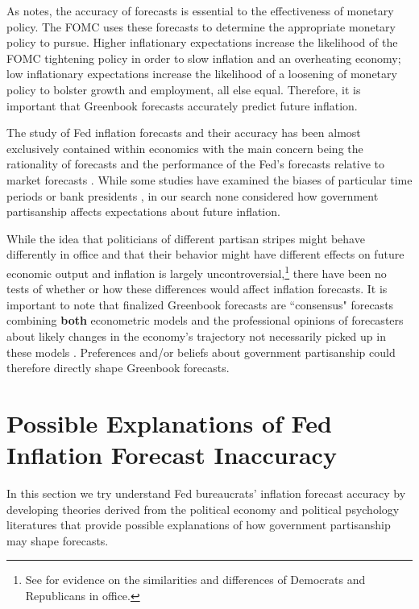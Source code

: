 \documentclass[a4paper]{article}\usepackage{graphicx, color}
\begin{document}
As \cite{Svensson2005} notes, the accuracy of forecasts is essential to the effectiveness of monetary policy. The FOMC uses these forecasts to determine the appropriate monetary policy to pursue. Higher inflationary expectations increase the likelihood of the FOMC tightening policy in order to slow inflation and an overheating economy; low inflationary expectations increase the likelihood of a loosening of monetary policy to bolster growth and employment, all else equal. Therefore, it is important that Greenbook forecasts accurately predict future inflation.

The study of Fed inflation forecasts and their accuracy has been almost exclusively contained within economics with the main concern being the rationality of forecasts \cite[e.g.][]{Capistran2006, Romer2000} and the performance of the Fed's forecasts relative to market forecasts \cite[e.g.][]{Faust2007, Gamber2009}. While some studies have examined the biases of particular time periods \cite[e.g.][]{Capistran2006} or bank presidents \cite[e.g.][]{Havrilesky1995}, in our search none considered how government partisanship affects expectations about future inflation.
 
While the idea that politicians of different partisan stripes might behave differently in office and that their behavior might have different effects on future economic output and inflation is largely uncontroversial,\footnote{See \cite{Bartels2008} for evidence on the similarities and differences of Democrats and Republicans in office.} there have been no tests of whether or how these differences would affect inflation forecasts. It is important to note that finalized Greenbook forecasts are ``consensus" forecasts combining \textbf{both} econometric models and the professional opinions of forecasters about likely changes in the economy's trajectory not necessarily picked up in these models \citep{Karamouzis1989,Reifschneider1997}. Preferences and/or beliefs about government partisanship could therefore directly shape Greenbook forecasts.

\section{Possible Explanations of Fed Inflation Forecast Inaccuracy}

In this section we try understand Fed bureaucrats' inflation forecast accuracy by developing theories derived from the political economy and political psychology literatures that provide possible explanations of how government partisanship may shape forecasts. 
\end{document}
